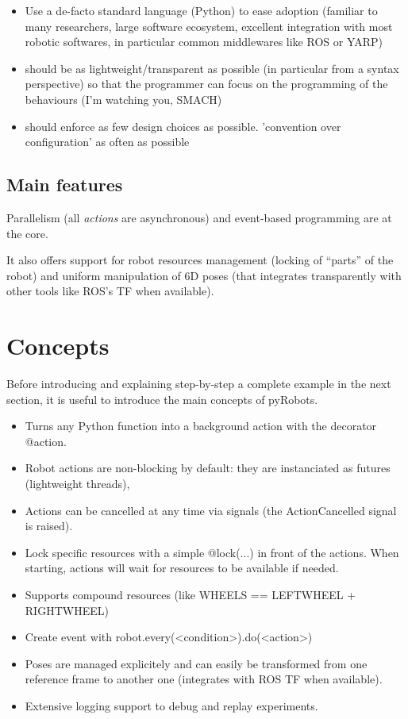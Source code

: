 \documentclass[a4paper, 10pt, conference]{ieeeconf}      %
\newcommand{\pyRobots}{{{\sc pyRobots}}}
\begin{document}
\begin{itemize}
    \item Use a de-facto standard language (Python) to ease adoption (familiar to
        many researchers, large software ecosystem, excellent integration with
        most robotic softwares, in particular common middlewares like ROS or
        YARP)
    \item should be as lightweight/transparent as possible (in particular from a
        syntax perspective) so that the
        programmer can focus on the programming of the behaviours (I'm
        watching you, SMACH)
    \item should enforce as few design choices as possible. 'convention over
        configuration' as often as possible
\end{itemize}

\subsection{Main features}

Parallelism (all \emph{actions} are asynchronous) and event-based programming
are at the core.

It also offers support for robot resources management (locking of ``parts'' of
the robot) and uniform manipulation of 6D poses (that integrates transparently
with other tools like ROS's TF when available).

\section{Concepts}

Before introducing and explaining step-by-step a complete example in the next
section, it is useful to introduce the main concepts of \pyRobots.


\begin{itemize}
    \item Turns any Python function into a background action with the decorator
        @action.
    \item Robot actions are non-blocking by default: they are instanciated as
        futures (lightweight threads),
    \item Actions can be cancelled at any time via signals (the
        ActionCancelled signal is raised).
    \item Lock specific resources with a simple @lock(...) in front of the
        actions. When starting, actions will wait for resources to be
        available if needed.
    \item Supports compound resources (like WHEELS == LEFTWHEEL +
        RIGHTWHEEL)
    \item Create event with robot.every(<condition>).do(<action>)
    \item Poses are managed explicitely and can easily be
        transformed from one reference frame to another one
        (integrates with ROS TF when available).
    \item Extensive logging support to debug and replay
        experiments.
\end{itemize}
\end{document}
